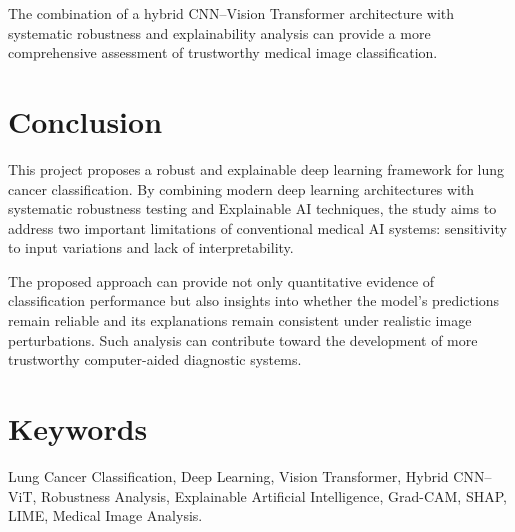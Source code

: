\documentclass[12pt,a4paper]{article}
\begin{document}
The combination of a hybrid CNN--Vision Transformer architecture with systematic robustness and explainability analysis can provide a more comprehensive assessment of trustworthy medical image classification.

\section{Conclusion}

This project proposes a robust and explainable deep learning framework for lung cancer classification. By combining modern deep learning architectures with systematic robustness testing and Explainable AI techniques, the study aims to address two important limitations of conventional medical AI systems: sensitivity to input variations and lack of interpretability.

The proposed approach can provide not only quantitative evidence of classification performance but also insights into whether the model's predictions remain reliable and its explanations remain consistent under realistic image perturbations. Such analysis can contribute toward the development of more trustworthy computer-aided diagnostic systems.

\section*{Keywords}

Lung Cancer Classification, Deep Learning, Vision Transformer, Hybrid CNN--ViT, Robustness Analysis, Explainable Artificial Intelligence, Grad-CAM, SHAP, LIME, Medical Image Analysis.
\end{document}
